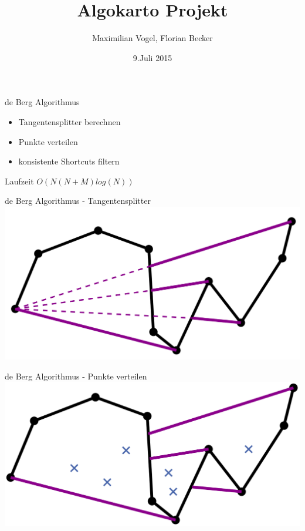 \documentclass[14pt]{beamer}
\title[AlgoKarto]{Algokarto Projekt}
\author[Maximilian Vogel, Florian Becker]{Maximilian Vogel, Florian Becker}
\date[9.Juli 2015]{9.Juli 2015}
\begin{document}
\begin{frame}
\large
  \titlepage
\end{frame}

\begin{frame}{de Berg Algorithmus}
  \begin{itemize}
        \item Tangentensplitter berechnen
        \item Punkte verteilen
        \item konsistente Shortcuts filtern
  \end{itemize}

  
  \begin{block}{Laufzeit}
     $O(N(N+M)log(N))$
  \end{block}
 
\end{frame}

\begin{frame}{de Berg Algorithmus - Tangentensplitter}
\includegraphics[width=1.0\textwidth]{img/tangentsplitter.png}
\end{frame}

\begin{frame}{de Berg Algorithmus - Punkte verteilen}
\includegraphics[width=1.0\textwidth]{img/distributepoints.png}
\end{frame}
\end{document}
